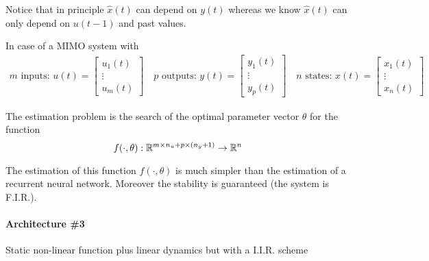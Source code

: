 \begin{rem}
    Notice that in principle $\hat{x}(t)$ can depend on $y(t)$ whereas we know $\hat{x}(t)$ can only depend on $u(t-1)$ and past values.

    In case of a MIMO system with
    \begin{align*}
        m \text{ inputs: } u(t) = \begin{bmatrix}
            u_1(t) \\
            \vdots \\
            u_m(t)
        \end{bmatrix} \quad p \text{ outputs: } y(t) = \begin{bmatrix}
            y_1(t) \\
            \vdots \\
            y_p(t)
        \end{bmatrix} \quad n \text{ states: } x(t) = \begin{bmatrix}
            x_1(t) \\
            \vdots \\
            x_n(t)
        \end{bmatrix}
    \end{align*}

    The estimation problem is the search of the optimal parameter vector $\theta$ for the function
    \[
        f(\cdot, \theta): \mathbb{R}^{m\times n_u + p \times (n_y + 1)} \rightarrow \mathbb{R}^n
    \]

    The estimation of this function $f(\cdot, \theta)$ is much simpler than the estimation of a recurrent neural network.
    Moreover the stability is guaranteed (the system is F.I.R.).
\end{rem}

\paragraph{Architecture \#3} Static non-linear function plus linear dynamics but with a I.I.R. scheme

